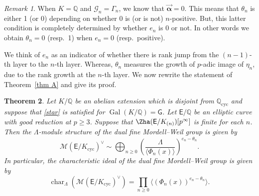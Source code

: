 \documentclass{amsart}
\newtheorem{theorem}{Theorem}[section]
\numberwithin{equation}{section}
\theoremstyle{remark}
\newtheorem{remark}[theorem]{Remark}
\newcommand{\val}{\vec{\boldsymbol{\alpha}}}
\newcommand{\EC}{\mathsf{E}}
\newcommand{\cG}{\mathcal{G}}
\newcommand{\cM}{\mathcal{M}}
\newcommand{\Gal}{\operatorname{Gal}}
\newcommand{\Q}{\mathbb{Q}}
\newcommand{\cyc}{\operatorname{{cyc}}}
\newcommand{\charac}{\operatorname{char}}
\theoremstyle{plain} %
\begin{document}
\begin{remark}
When $K=\Q$ and $\cG_n = \Gamma_n$, we know that $\val = 0$.
This means that $\theta_n$ is either 1 (or 0) depending on whether $0$ is (or is not) $n$-positive.
But, this latter condition is completely determined by whether $e_n$ is 0 or not.
In other words we obtain $\theta_n = 0$ (resp.~1) when $e_n = 0$ (resp.~positive).
\end{remark}

We think of $e_n$ as an indicator of whether there is rank jump from the $(n-1)$-th layer to the $n$-th layer.
Whereas, $\theta_n$ measures the growth of $p$-adic image of $\eta_n$, due to the rank growth at the $n$-th layer.
We now rewrite the statement of Theorem~\ref{thm A} and give its proof.

\begin{theorem}
\label{main result fine Selmer} %
Let $K/\Q$ be an abelian extension which is disjoint from $\Q_{\cyc}$ and suppose that \ref{star} is satisfied for $\Gal(K/\Q) = \mathsf{G}$.
Let $\EC/\Q$ be an elliptic curve with good reduction at $p\geq 3$.
Suppose that $\Zha(\EC/K_{(n)})[p^\infty]$ is finite for each $n$.
Then the $\Lambda$-module structure of the dual fine Mordell--Weil group is given by
\[
\cM(\EC/K_{\cyc})^\vee \sim \bigoplus_{n\geq 0} \left(\frac{\Lambda}{\langle\Phi_n(x)\rangle}\right)^{e_n - \theta_n}.
\]
In particular, the characteristic ideal of the dual fine Mordell--Weil group is given by
\[
\charac_{\Lambda}(\cM(\EC/K_{\cyc})^\vee) = \prod_{n\geq 0} \langle (\Phi_n(x))^{e_n -\theta_n} \rangle.
\]
\end{theorem}
\end{document}

